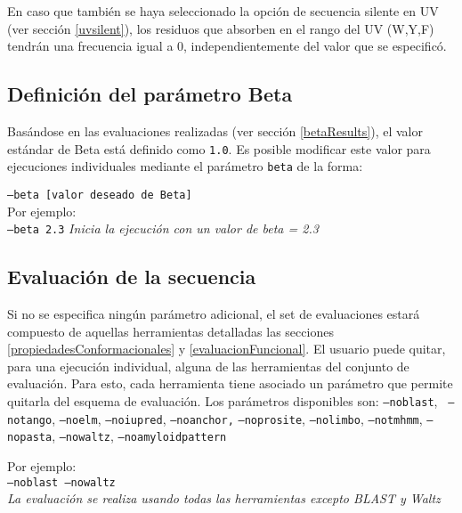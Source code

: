 En caso que también se haya seleccionado la opción de secuencia silente en UV (ver sección \ref{uvsilent}), los residuos que absorben en el rango del UV (W,Y,F) tendrán una frecuencia igual a 0, independientemente del valor que se especificó.

\subsection{Definición del parámetro Beta}

Basándose en las evaluaciones realizadas (ver sección \ref{betaResults}), el valor estándar de Beta está definido como \texttt{1.0}. 
Es posible modificar este valor para ejecuciones individuales mediante el parámetro \texttt{beta} de la forma:

\indent \texttt{--beta [valor deseado de Beta]} 
\\Por ejemplo: \\
\indent \texttt{--beta 2.3} \hspace{0.5cm} \textit{Inicia la ejecución con un valor de beta = 2.3}



\subsection{Evaluación de la secuencia}\label{evaluacion}

Si no se especifica ningún parámetro adicional, el set de evaluaciones estará compuesto de aquellas herramientas detalladas las secciones \ref{propiedadesConformacionales} y \ref{evaluacionFuncional}.
El usuario puede quitar, para una ejecución individual, alguna de las herramientas del conjunto de evaluación. Para esto, cada herramienta tiene asociado un parámetro que permite quitarla del esquema de evaluación.
Los parámetros disponibles son: 
\texttt{--noblast}, \texttt{ --notango}, \texttt{--noelm}, \texttt{--noiupred}, \texttt{--noanchor,}  \texttt{--noprosite}, 
\texttt{--nolimbo}, 
\texttt{--notmhmm}, 
\texttt{--nopasta}, 
\texttt{--nowaltz}, 
\texttt{--noamyloidpattern}

\noindent Por ejemplo: \\
\indent \texttt{--noblast --nowaltz} \\%
\begin{adjustbox}{width=\textwidth}
\indent \indent \textit{La evaluación se realiza usando todas las herramientas excepto BLAST y Waltz}
\end{adjustbox}

